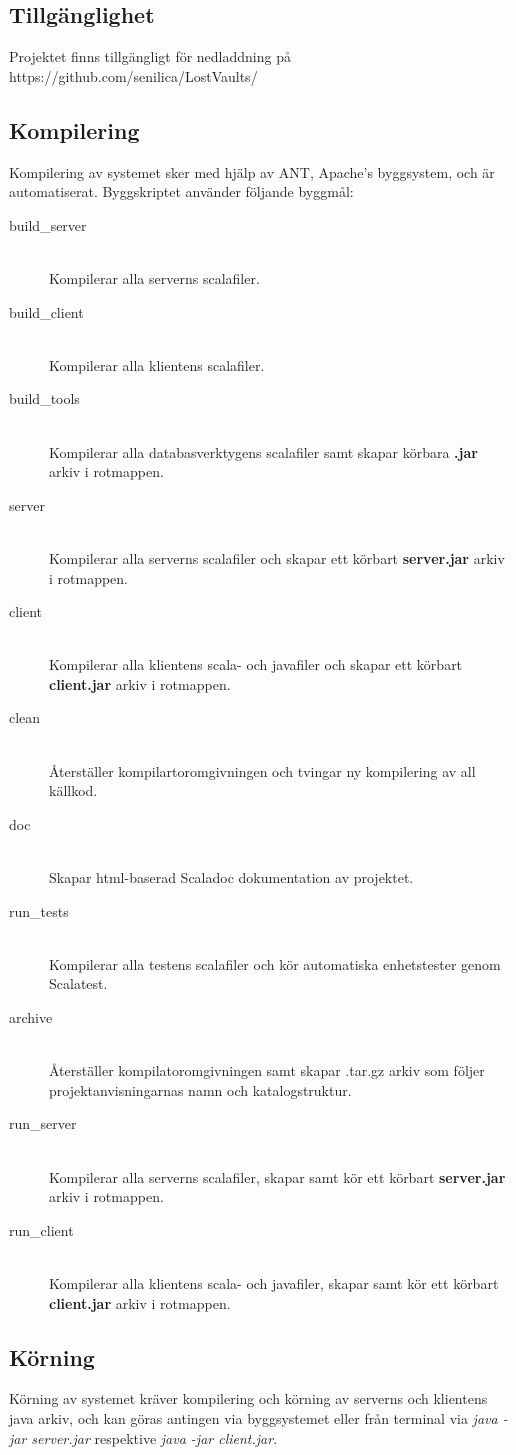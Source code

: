 \documentclass[a4paper]{article}
\begin{document}
\subsection{Tillgänglighet}
Projektet finns tillgängligt för nedladdning på https://github.com/senilica/LostVaults/

\subsection{Kompilering}
Kompilering av systemet sker med hjälp av ANT, Apache's byggsystem, och är automatiserat. Byggskriptet använder följande byggmål:
\begin{description}
\item[build\_server] \hfill \\ Kompilerar alla serverns scalafiler.
\item[build\_client] \hfill \\ Kompilerar alla klientens scalafiler.
\item[build\_tools] \hfill \\ Kompilerar alla databasverktygens scalafiler samt skapar körbara \textbf{.jar} arkiv i rotmappen.
\item[server] \hfill \\ Kompilerar alla serverns scalafiler och skapar ett körbart \textbf{server.jar} arkiv i rotmappen.
\item[client] \hfill \\ Kompilerar alla klientens scala- och javafiler och skapar ett körbart \textbf{client.jar} arkiv i rotmappen.
\item[clean] \hfill \\ Återställer kompilartoromgivningen och tvingar ny kompilering av all källkod.
\item[doc] \hfill \\ Skapar html-baserad Scaladoc dokumentation av projektet.
\item[run\_tests] \hfill \\ Kompilerar alla testens scalafiler och kör automatiska enhetstester genom Scalatest.
\item[archive] \hfill \\ Återställer kompilatoromgivningen samt skapar .tar.gz arkiv som följer projektanvisningarnas namn och katalogstruktur.
\item[run\_server] \hfill \\ Kompilerar alla serverns scalafiler, skapar samt kör ett körbart \textbf{server.jar} arkiv i rotmappen.
\item[run\_client] \hfill \\ Kompilerar alla klientens scala- och javafiler, skapar samt kör ett körbart \textbf{client.jar} arkiv i rotmappen.
\end{description}

\subsection{Körning}
Körning av systemet kräver kompilering och körning av serverns och klientens java arkiv, och kan göras antingen via byggsystemet
eller från terminal via \textit{java -jar server.jar} respektive  \textit{java -jar client.jar}.
\end{document}
